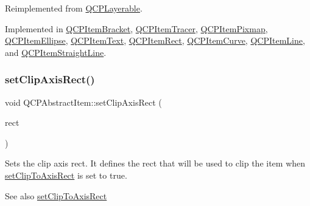 Reimplemented from \hyperlink{class_q_c_p_layerable_a04db8351fefd44cfdb77958e75c6288e}{Q\+C\+P\+Layerable}.



Implemented in \hyperlink{class_q_c_p_item_bracket_a49a6b2f41e0a8c2a2e3a2836027a8455}{Q\+C\+P\+Item\+Bracket}, \hyperlink{class_q_c_p_item_tracer_a9fd955fea40e977d66f3a9fd5765aec4}{Q\+C\+P\+Item\+Tracer}, \hyperlink{class_q_c_p_item_pixmap_a65d1ede7bb479b90d40186d083071947}{Q\+C\+P\+Item\+Pixmap}, \hyperlink{class_q_c_p_item_ellipse_ab6e2b8a29695c606c7731e498297ca29}{Q\+C\+P\+Item\+Ellipse}, \hyperlink{class_q_c_p_item_text_a676aaec10ad3cc4d7d0e4847db04c838}{Q\+C\+P\+Item\+Text}, \hyperlink{class_q_c_p_item_rect_a2e68621b75bae4da6ae0ab2cdd0dd733}{Q\+C\+P\+Item\+Rect}, \hyperlink{class_q_c_p_item_curve_a718fa40140a43c8afbd41a3d85c92d72}{Q\+C\+P\+Item\+Curve}, \hyperlink{class_q_c_p_item_line_a8e02bfbca04fbcf3dbc375a2bf693229}{Q\+C\+P\+Item\+Line}, and \hyperlink{class_q_c_p_item_straight_line_a2e36c9d4dcc3aeda78a5584f790e39e3}{Q\+C\+P\+Item\+Straight\+Line}.

\mbox{\label{class_q_c_p_abstract_item_a7dc75fcbcd10206fe0b75d757ea7a347}} 
\subsubsection{\texorpdfstring{set\+Clip\+Axis\+Rect()}{setClipAxisRect()}}
{\footnotesize\ttfamily void Q\+C\+P\+Abstract\+Item\+::set\+Clip\+Axis\+Rect (\begin{DoxyParamCaption}\item[{\hyperlink{class_q_c_p_axis_rect}{Q\+C\+P\+Axis\+Rect} $\ast$}]{rect }\end{DoxyParamCaption})}

Sets the clip axis rect. It defines the rect that will be used to clip the item when \hyperlink{class_q_c_p_abstract_item_a39e05b9d4176b9accafc746d16ca6a06}{set\+Clip\+To\+Axis\+Rect} is set to true.

\begin{DoxySeeAlso}{See also}
\hyperlink{class_q_c_p_abstract_item_a39e05b9d4176b9accafc746d16ca6a06}{set\+Clip\+To\+Axis\+Rect} 
\end{DoxySeeAlso}
\mbox{\label{class_q_c_p_abstract_item_a39e05b9d4176b9accafc746d16ca6a06}} 
